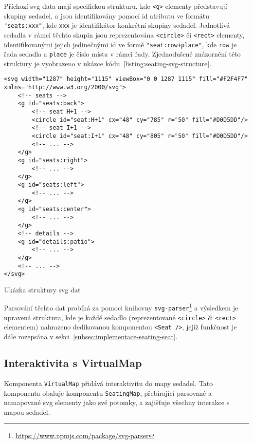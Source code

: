 Příchozí \ac{svg} data mají specifickou strukturu, kde \texttt{<g>} elementy představují skupiny sedadel, a jsou identifikovány pomocí id atributu ve formátu \texttt{"seats:xxx"}, kde \texttt{xxx} je identifikátor konkrétní skupiny sedadel.
Jednotlivá sedadla v rámci těchto skupin jsou reprezentována \texttt{<circle>} či \texttt{<rect>} elementy, identifikovanými jejich jedinečnými id ve formě \texttt{"seat:row+place"}, kde \texttt{row} je řada sedadla a \texttt{place} je číslo místa v rámci řady.
Zjednodušené znázornění této struktury je vyobrazeno v ukázce kódu~\ref{listing:seating-svg-structure}.

\begin{listing}[H]
\begin{verbatim}
<svg width="1287" height="1115" viewBox="0 0 1287 1115" fill="#F2F4F7" xmlns="http://www.w3.org/2000/svg">
    <!-- seats -->
    <g id="seats:back">
        <!-- seat H+1 -->
        <circle id="seat:H+1" cx="48" cy="785" r="50" fill="#D0D5DD"/>
        <!-- seat I+1 -->
        <circle id="seat:I+1" cx="48" cy="805" r="50" fill="#D0D5DD"/>
        <!-- ... -->
    </g>
    <g id="seats:right">
        <!-- ... -->
    </g>
    <g id="seats:left">
        <!-- ... -->
    </g>
    <g id="seats:center">
        <!-- ... -->
    </g>
    <!-- details -->
    <g id="details:patio">
        <!-- ... -->
    </g>
    <!-- ... -->
</svg>
\end{verbatim}
\caption{Ukázka struktury \ac{svg} dat}
\label{listing:seating-svg-structure}
\end{listing}

Parsování těchto dat probíhá za pomoci knihovny \texttt{svg-parser}\footnote{\url{https://www.npmjs.com/package/svg-parser}} a výsledkem je upravená struktura, kde je každé sedadlo (reprezentované \texttt{<circle>} či \texttt{<rect>} elementem) nahrazeno dedikovanou komponentou \texttt{<Seat />}, jejíž funkčnost je dále rozepsána v sekci~\ref{subsec:implementace-seating-seat}.

\subsection{Interaktivita s VirtualMap}
\label{subsec:implementace-seating-virtualmap}
Komponenta \texttt{VirtualMap} přidává interaktivitu do mapy sedadel.
Tato komponenta obaluje komponentu \texttt{SeatingMap}, přebírající parsované a namapované \ac{svg} elementy jako své potomky, a zajišťuje všechny interakce s mapou sedadel.

